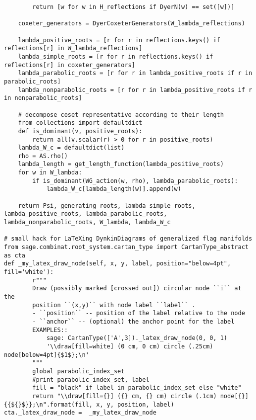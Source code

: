 \begin{verbatim}
        return [w for w in H_reflections if DyerN(w) == set([w])]

    coxeter_generators = DyerCoxeterGenerators(W_lambda_reflections)

    lambda_positive_roots = [r for r in reflections.keys() if reflections[r] in W_lambda_reflections]
    lambda_simple_roots = [r for r in reflections.keys() if reflections[r] in coxeter_generators]
    lambda_parabolic_roots = [r for r in lambda_positive_roots if r in parabolic_roots]
    lambda_nonparabolic_roots = [r for r in lambda_positive_roots if r in nonparabolic_roots]

    # decompose coset representative according to their length
    from collections import defaultdict
    def is_dominant(v, positive_roots):
        return all(v.scalar(r) > 0 for r in positive_roots)
    lambda_W_c = defaultdict(list)
    rho = AS.rho()
    lambda_length = get_length_function(lambda_positive_roots)
    for w in W_lambda:
        if is_dominant(WG_action(w, rho), lambda_parabolic_roots):
            lambda_W_c[lambda_length(w)].append(w)

    return Psi, generating_roots, lambda_simple_roots, lambda_positive_roots, lambda_parabolic_roots, lambda_nonparabolic_roots, W_lambda, lambda_W_c

# small hack for LaTeXing DynkinDiagrams of generalized flag manifolds
from sage.combinat.root_system.cartan_type import CartanType_abstract as cta
def _my_latex_draw_node(self, x, y, label, position="below=4pt", fill='white'):
        r"""
        Draw (possibly marked [crossed out]) circular node ``i`` at the
        position ``(x,y)`` with node label ``label`` .
        - ``position`` -- position of the label relative to the node
        - ``anchor`` -- (optional) the anchor point for the label
        EXAMPLES::
            sage: CartanType(['A',3])._latex_draw_node(0, 0, 1)
            '\\draw[fill=white] (0 cm, 0 cm) circle (.25cm) node[below=4pt]{$1$};\n'
        """
        global parabolic_index_set
        #print parabolic_index_set, label
        fill = "black" if label in parabolic_index_set else "white"
        return "\\draw[fill={}] ({} cm, {} cm) circle (.1cm) node[{}]{{${}$}};\n".format(fill, x, y, position, label)
cta._latex_draw_node =  _my_latex_draw_node


\end{verbatim}
